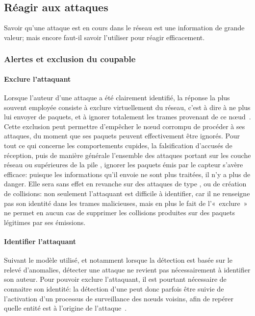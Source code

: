 \subsection{Réagir aux attaques}
Savoir qu'une attaque est en cours dans le réseau est une information de grande valeur; mais encore faut-il savoir l'utiliser pour réagir efficacement.

    \subsubsection{Alertes et exclusion du coupable}
    \paragraph{Exclure l'attaquant}
Lorsque l'auteur d'une attaque a été clairement identifié, la réponse la plus souvent employée consiste à exclure virtuellement du réseau, c'est à dire à ne plus lui envoyer de paquets, et à ignorer totalement les trames provenant de ce nœud~\cite{LC08}.
Cette exclusion peut permettre d'empêcher le nœud corrompu de procéder à ses attaques, du moment que ses paquets peuvent effectivement être ignorés.
Pour tout ce qui concerne les comportements cupides, la falsification d'accusés de réception, puis de manière générale l'ensemble des attaques portant sur les couche réseau ou supérieures de la pile \tcpip, ignorer les paquets émis par le capteur s'avère efficace: puisque les informations qu'il envoie ne sont plus traitées, il n'y a plus de danger.
Elle sera sans effet en revanche sur des attaques de type , ou de création de collisions: non seulement l'attaquant est difficile à identifier, car il ne renseigne pas son identité dans les trames malicieuses, mais en plus le fait de l'« exclure » ne permet en aucun cas de supprimer les collisions produites sur des paquets légitimes par ses émissions.

        \paragraph{Identifier l'attaquant}
Suivant le modèle utilisé, et notamment lorsque la détection est basée sur le relevé d'anomalies, détecter une attaque ne revient pas nécessairement à identifier son auteur.
Pour pouvoir exclure l'attaquant, il est pourtant nécessaire de connaitre son identité: la détection d'une  peut donc parfois être suivie de l'activation d'un processus de surveillance des nœuds voisins, afin de repérer quelle entité est à l'origine de l'attaque~\cite{BMS13}.

